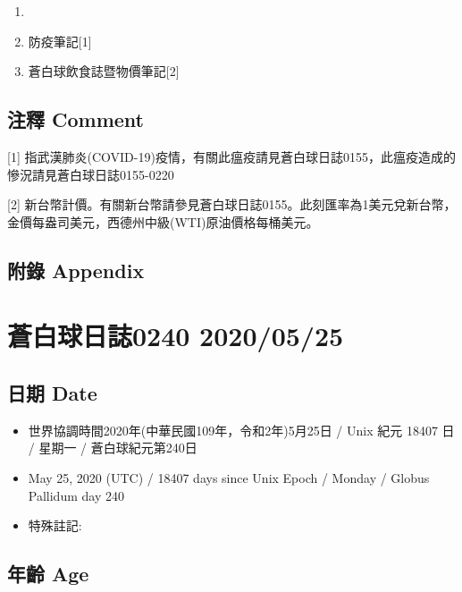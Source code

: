 \documentclass[
]{article}
\providecommand{\tightlist}{%
  \setlength{\itemsep}{0pt}\setlength{\parskip}{0pt}}
\begin{document}
\begin{enumerate}
\def\labelenumi{\arabic{enumi}.}
\item
\item
  防疫筆記{[}1{]}
\item
  蒼白球飲食誌暨物價筆記{[}2{]}
\end{enumerate}

\hypertarget{ux6ce8ux91cb-comment-23}{%
\subsection{注釋 Comment}\label{ux6ce8ux91cb-comment-23}}

{[}1{]}
指武漢肺炎(COVID-19)疫情，有關此瘟疫請見蒼白球日誌0155，此瘟疫造成的慘況請見蒼白球日誌0155-0220

{[}2{]}
新台幣計價。有關新台幣請參見蒼白球日誌0155。此刻匯率為1美元兌新台幣，金價每盎司美元，西德州中級(WTI)原油價格每桶美元。

\hypertarget{ux9644ux9304-appendix-23}{%
\subsection{附錄 Appendix}\label{ux9644ux9304-appendix-23}}

\hypertarget{ux84bcux767dux7403ux65e5ux8a8c0240-20200525}{%
\section{蒼白球日誌0240
2020/05/25}\label{ux84bcux767dux7403ux65e5ux8a8c0240-20200525}}

\hypertarget{ux65e5ux671f-date-24}{%
\subsection{日期 Date}\label{ux65e5ux671f-date-24}}

\begin{itemize}
\tightlist
\item
  世界協調時間2020年(中華民國109年，令和2年)5月25日 / Unix 紀元 18407 日
  / 星期一 / 蒼白球紀元第240日
\item
  May 25, 2020 (UTC) / 18407 days since Unix Epoch / Monday / Globus
  Pallidum day 240
\item
  特殊註記:
\end{itemize}

\hypertarget{ux5e74ux9f61-age-24}{%
\subsection{年齡 Age}\label{ux5e74ux9f61-age-24}}
\end{document}
